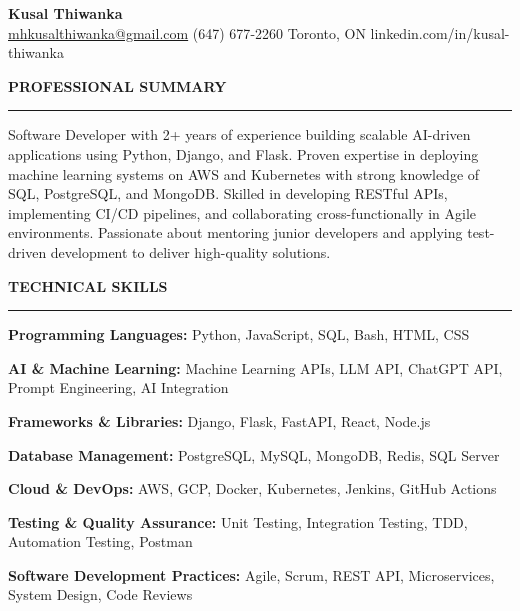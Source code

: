 \documentclass[10pt,letterpaper]{article}
\begin{document}
\begin{center}
{\LARGE\textbf{Kusal Thiwanka}}\\[3pt]
\href{mailto:mhkusalthiwanka@gmail.com}{mhkusalthiwanka@gmail.com}\hspace{2em}%
(647) 677{-}2260\hspace{2em}%
Toronto, ON\hspace{2em}
linkedin.com/in/kusal-thiwanka
\end{center}

\vspace{6pt}

\textbf{PROFESSIONAL SUMMARY}\\[-8pt]
\noindent\rule{\textwidth}{1pt}

\vspace{-2pt}

Software Developer with 2+ years of experience building scalable AI-driven applications using Python, Django, and Flask. Proven expertise in deploying machine learning systems on AWS and Kubernetes with strong knowledge of SQL, PostgreSQL, and MongoDB. Skilled in developing RESTful APIs, implementing CI/CD pipelines, and collaborating cross-functionally in Agile environments. Passionate about mentoring junior developers and applying test-driven development to deliver high-quality solutions.

\vspace{8pt}

\textbf{TECHNICAL SKILLS}\\[-8pt]
\noindent\rule{\textwidth}{1pt}

\vspace{-2pt}

\textbf{Programming Languages:} Python, JavaScript, SQL, Bash, HTML, CSS

\textbf{AI \& Machine Learning:} Machine Learning APIs, LLM API, ChatGPT API, Prompt Engineering, AI Integration

\textbf{Frameworks \& Libraries:} Django, Flask, FastAPI, React, Node.js

\textbf{Database Management:} PostgreSQL, MySQL, MongoDB, Redis, SQL Server

\textbf{Cloud \& DevOps:} AWS, GCP, Docker, Kubernetes, Jenkins, GitHub Actions

\textbf{Testing \& Quality Assurance:} Unit Testing, Integration Testing, TDD, Automation Testing, Postman

\textbf{Software Development Practices:} Agile, Scrum, REST API, Microservices, System Design, Code Reviews
\end{document}
